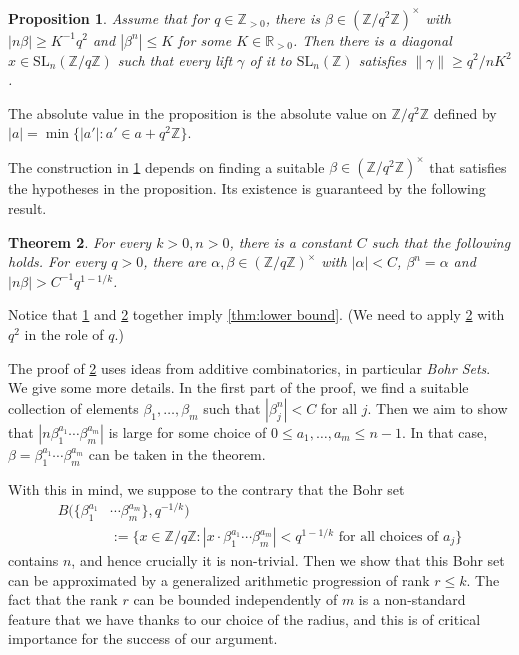\documentclass[12pt, a4paper]{amsart}
\numberwithin{equation}{section}
\newtheorem{theorem}{Theorem}[section]
\newtheorem{prop}[theorem]{Proposition}
\theoremstyle{definition}
\newcommand{\R}{\mathbb{R}}
\newcommand{\Z}{\mathbb{Z}}
\newcommand{\SL}{\mathrm{SL}}
\begin{document}
\begin{prop} \label{prop:n-th root lemma}
	Assume that for $q\in \Z_{>0}$, there is $\beta\in(\Z/q^2\Z)^\times$ with $|n\beta|\ge K^{-1}q^{2}$
	and $|\beta^{n}|\le K$ for some $K\in\R_{>0}$. Then there is a diagonal $x\in \SL_n(\Z/q\Z)$ such that every lift $\gamma$ of it to $\SL_n(\Z)$ satisfies $\|\gamma\|\ge  q^{2}/nK^2$.
\end{prop}
The absolute value in the proposition is the absolute value on $\Z/q^2\Z$ defined by $|a|=\min\{|a'|:a'\in a+q^2\Z\}$.

The construction in \cref{prop:n-th root lemma} depends on finding a suitable
$\beta\in(\Z/q^2\Z)^\times$ that satisfies the hypotheses in the proposition.
Its existence is guaranteed by the following result.

\begin{theorem}\label{thm:large roots}
	For every $k>0,n>0$, there is a constant $C$ such that the following holds.
	For every $q>0$, there are $\alpha,\beta\in(\Z/q\Z)^\times$ with
	$|\alpha|<C$, $\beta^{n}=\alpha$ and $|n\beta|>C^{-1}q^{1-1/k}$.
\end{theorem}

Notice that \cref{prop:n-th root lemma} and \cref{thm:large roots} together imply \cref{thm:lower bound}.
(We need to apply \cref{thm:large roots} with $q^2$ in the role of $q$.)

The proof of \cref{thm:large roots} uses ideas from additive combinatorics, in particular \emph{Bohr Sets}.
We give some more details.
In the first part of the proof, we find a suitable collection of elements
$\beta_1,\ldots,\beta_m$ such that $|\beta_j^n|<C$ for all $j$.
Then we aim to show that $|n\beta_1^{a_1}\cdots\beta_m^{a_m}|$ is large for some choice
of $0\le a_1,\ldots,a_m\le n-1$.
In that case, $\beta=\beta_1^{a_1}\cdots\beta_m^{a_m}$ can be taken in the theorem.

With this in mind, we suppose to the contrary that the Bohr set
\begin{align*}
B(\{\beta_1^{a_1}&\cdots\beta_m^{a_m}\}, q^{-1/k})\\
&:=\{x\in\Z/q\Z:|x\cdot \beta_1^{a_1}\cdots\beta_m^{a_m}|<q^{1-1/k}\text{ for all choices of $a_j$}\}
\end{align*}
contains $n$, and hence crucially it is non-trivial.
Then we show that this Bohr set can be approximated by a generalized arithmetic
progression of rank $r \le k$.
The fact that the rank $r$ can be bounded independently of $m$ is a non-standard
feature that we have thanks to our choice of the radius, and this is of critical
importance for the success of our argument.
\end{document}

